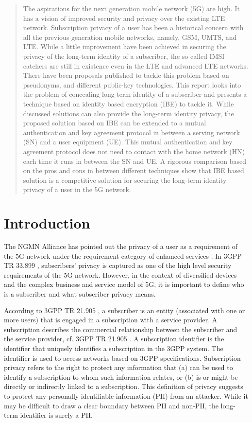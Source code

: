 \documentclass[runningheads,a4paper]{llncs} %
\begin{document}
\begin{abstract}
The aspirations for the next generation mobile network (5G) are high. It has a vision of improved security and privacy over the existing LTE network. Subscription privacy of a user has been a historical concern with all the previous generation mobile networks, namely, GSM, UMTS, and LTE. While a little improvement have been achieved in securing the privacy of the long-term identity of a subscriber, the so called IMSI catchers are still in existence even in the LTE and advanced LTE networks. There have been proposals published to tackle this problem based on pseudonyms, and different public-key technologies. This report looks into the problem of concealing long-term identity of a subscriber and presents a technique based on identity based encryption (IBE) to tackle it. While discussed solutions can also provide the long-term identity privacy, the proposed solution based on IBE can be extended to a mutual authentication and key agreement protocol in between a serving network (SN) and a user equipment (UE). This mutual authentication and key agreement protocol does not need to contact with the home network (HN) each time it runs in between the SN and UE. A rigorous comparison based on the pros and cons in between different techniques show that IBE based solution is a competitive solution for securing the long-term identity privacy of a user in the 5G network.
\end{abstract}


\section{Introduction}
\label{intro} The NGMN Alliance has pointed out the privacy of a user as a requirement of the 5G network under the requirement category of enhanced services \cite{NGMN_white_paper}. In 3GPP TR 33.899 \cite{TR33899}, subscribers' privacy is captured as one of the high level security requirements of the 5G network. However, in the context of diversified devices and the complex business and service model of 5G, it is important to define who is a subscriber and what subscriber privacy means. 

According to 3GPP TR 21.905 \cite{TR21905}, a subscriber is an entity (associated with one or more users) that is engaged in a subscription with a service provider. A subscription describes the commercial relationship between the subscriber and the service provider, cf. 3GPP TR 21.905 \cite{TR21905}. A subscription identifier is the identifier that uniquely identifies a subscription in the 3GPP system. The identifier is used to access networks based on 3GPP specifications. Subscription privacy refers to the right to protect any information that (a) can be used to identify a subscription to whom such information relates, or (b) is or might be directly or indirectly linked to a subscription. This definition of privacy suggests to protect any personally identifiable information (PII) from an attacker. While it may be difficult to draw a clear boundary between PII and non-PII, the long-term identifier is surely a PII. 
\end{document}
